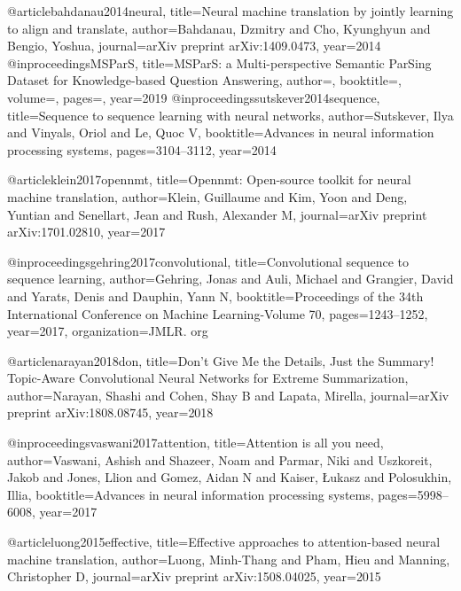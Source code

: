 @article{bahdanau2014neural,
  title={Neural machine translation by jointly learning to align and translate},
  author={Bahdanau, Dzmitry and Cho, Kyunghyun and Bengio, Yoshua},
  journal={arXiv preprint arXiv:1409.0473},
  year={2014}
}
@inproceedings{MSParS,
  title={MSParS: a Multi-perspective Semantic ParSing Dataset for Knowledge-based Question Answering},
  author={},
  booktitle={},
  volume={},
  pages={},
  year={2019}
}
@inproceedings{sutskever2014sequence,
  title={Sequence to sequence learning with neural networks},
  author={Sutskever, Ilya and Vinyals, Oriol and Le, Quoc V},
  booktitle={Advances in neural information processing systems},
  pages={3104--3112},
  year={2014}
}

@article{klein2017opennmt,
  title={Opennmt: Open-source toolkit for neural machine translation},
  author={Klein, Guillaume and Kim, Yoon and Deng, Yuntian and Senellart, Jean and Rush, Alexander M},
  journal={arXiv preprint arXiv:1701.02810},
  year={2017}
}

@inproceedings{gehring2017convolutional,
  title={Convolutional sequence to sequence learning},
  author={Gehring, Jonas and Auli, Michael and Grangier, David and Yarats, Denis and Dauphin, Yann N},
  booktitle={Proceedings of the 34th International Conference on Machine Learning-Volume 70},
  pages={1243--1252},
  year={2017},
  organization={JMLR. org}
}

@article{narayan2018don,
  title={Don't Give Me the Details, Just the Summary! Topic-Aware Convolutional Neural Networks for Extreme Summarization},
  author={Narayan, Shashi and Cohen, Shay B and Lapata, Mirella},
  journal={arXiv preprint arXiv:1808.08745},
  year={2018}
}

@inproceedings{vaswani2017attention,
  title={Attention is all you need},
  author={Vaswani, Ashish and Shazeer, Noam and Parmar, Niki and Uszkoreit, Jakob and Jones, Llion and Gomez, Aidan N and Kaiser, {\L}ukasz and Polosukhin, Illia},
  booktitle={Advances in neural information processing systems},
  pages={5998--6008},
  year={2017}
}

@article{luong2015effective,
  title={Effective approaches to attention-based neural machine translation},
  author={Luong, Minh-Thang and Pham, Hieu and Manning, Christopher D},
  journal={arXiv preprint arXiv:1508.04025},
  year={2015}
}